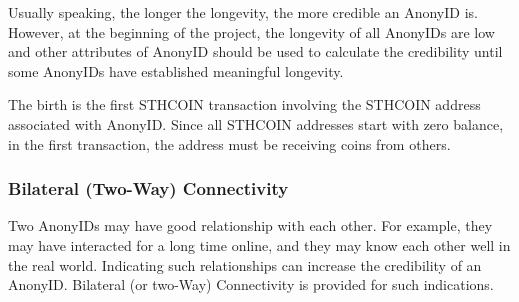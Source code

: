 \documentclass[12pt, a4paper]{article}
\begin{document}
Usually speaking, the longer the longevity, the more credible an AnonyID is. However, at the beginning of the project, the longevity of all AnonyIDs are low and other attributes of AnonyID should be used to calculate the credibility until some AnonyIDs have established meaningful longevity.


The birth is the first STHCOIN transaction involving the STHCOIN address associated with AnonyID. Since all STHCOIN addresses start with zero balance, in the first transaction, the address must be receiving coins from others.

\subsubsection{Bilateral (Two-Way) Connectivity}
\label{two-way}

Two AnonyIDs may have good relationship with each other. For example, they may have interacted for a long time online, and they may know each other well in the real world. Indicating such relationships can increase the credibility of an AnonyID. Bilateral (or two-Way) Connectivity is provided for such indications.
\end{document}
